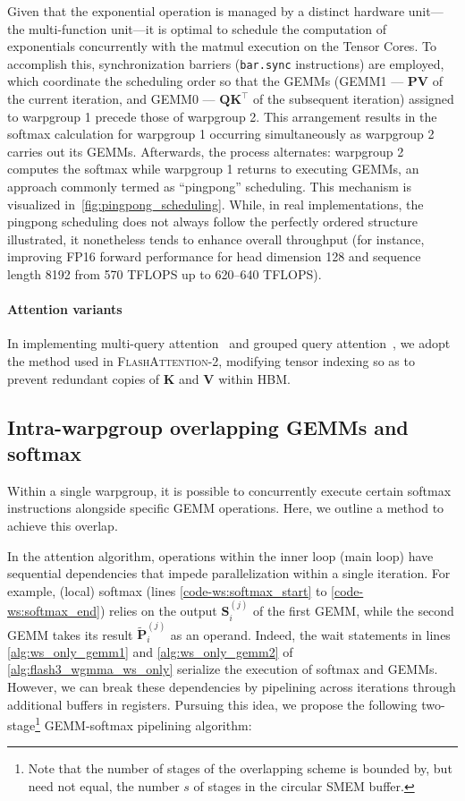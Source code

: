\begin{enumerate}
Given that the exponential operation is managed by a distinct hardware unit—the multi-function unit—it is optimal to schedule the computation of exponentials concurrently with the matmul execution on the Tensor Cores. To accomplish this, synchronization barriers (\texttt{bar.sync} instructions) are employed, which coordinate the scheduling order so that the GEMMs (GEMM1 — $\mathbf{P} \mathbf{V}$ of the current iteration, and GEMM0 — $\mathbf{Q} \mathbf{K}^\top$ of the subsequent iteration) assigned to warpgroup 1 precede those of warpgroup 2. This arrangement results in the softmax calculation for warpgroup 1 occurring simultaneously as warpgroup 2 carries out its GEMMs. Afterwards, the process alternates: warpgroup 2 computes the softmax while warpgroup 1 returns to executing GEMMs, an approach commonly termed as “pingpong” scheduling. This mechanism is visualized in~\cref{fig:pingpong_scheduling}. While, in real implementations, the pingpong scheduling does not always follow the perfectly ordered structure illustrated, it nonetheless tends to enhance overall throughput (for instance, improving FP16 forward performance for head dimension 128 and sequence length 8192 from 570 TFLOPS up to 620–640 TFLOPS).

\paragraph{Attention variants} In implementing multi-query attention~\citep{shazeer2019fast} and grouped query attention~\citep{ainslie2023gqa}, we adopt the method used in \textsc{FlashAttention-2}, modifying tensor indexing so as to prevent redundant copies of $\mathbf{K}$ and $\mathbf{V}$ within HBM.

\subsection{Intra-warpgroup overlapping GEMMs and softmax}

Within a single warpgroup, it is possible to concurrently execute certain softmax instructions alongside specific GEMM operations. Here, we outline a method to achieve this overlap.

In the attention algorithm, operations within the inner loop (main loop) have sequential dependencies that impede parallelization within a single iteration. For example, (local) softmax (lines \ref{code-ws:softmax_start} to \ref{code-ws:softmax_end}) relies on the output $\mathbf{S}_i^{(j)}$ of the first GEMM, while the second GEMM takes its result $\widetilde{\mathbf{P}}_i^{(j)}$ as an operand. Indeed, the wait statements in lines \ref{alg:ws_only_gemm1} and \ref{alg:ws_only_gemm2} of \cref{alg:flash3_wgmma_ws_only} serialize the execution of softmax and GEMMs. However, we can break these dependencies by pipelining across iterations through additional buffers in registers. Pursuing this idea, we propose the following two-stage\footnote{Note that the number of stages of the overlapping scheme is bounded by, but need not equal, the number $s$ of stages in the circular SMEM buffer.} GEMM-softmax pipelining algorithm:


\end{enumerate}
